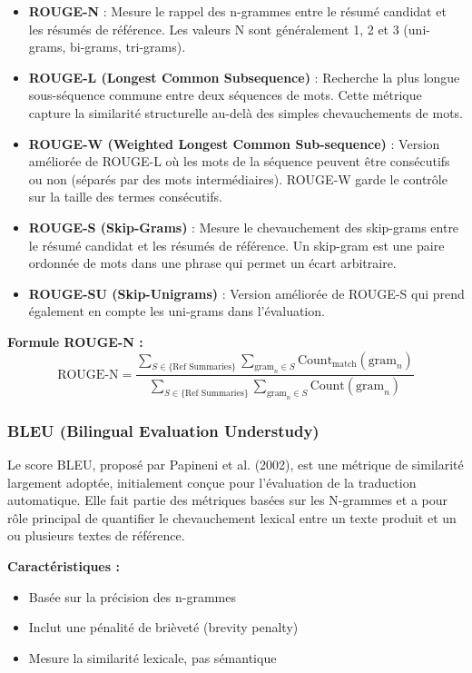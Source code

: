 \begin{itemize}
    \item \textbf{ROUGE-N} : Mesure le rappel des n-grammes entre le résumé candidat et les résumés de référence. Les valeurs N sont généralement 1, 2 et 3 (uni-grams, bi-grams, tri-grams).
    
    \item \textbf{ROUGE-L (Longest Common Subsequence)} : Recherche la plus longue sous-séquence commune entre deux séquences de mots. Cette métrique capture la similarité structurelle au-delà des simples chevauchements de mots.
    
    \item \textbf{ROUGE-W (Weighted Longest Common Sub-sequence)} : Version améliorée de ROUGE-L où les mots de la séquence peuvent être consécutifs ou non (séparés par des mots intermédiaires). ROUGE-W garde le contrôle sur la taille des termes consécutifs.
    
    \item \textbf{ROUGE-S (Skip-Grams)} : Mesure le chevauchement des skip-grams entre le résumé candidat et les résumés de référence. Un skip-gram est une paire ordonnée de mots dans une phrase qui permet un écart arbitraire.
    
    \item \textbf{ROUGE-SU (Skip-Unigrams)} : Version améliorée de ROUGE-S qui prend également en compte les uni-grams dans l'évaluation.
\end{itemize}

\textbf{Formule ROUGE-N :}
\[
\text{ROUGE-N} = \frac{\sum_{S \in \{\text{Ref Summaries}\}} \sum_{\text{gram}_n \in S} \text{Count}_{\text{match}}(\text{gram}_n)}{\sum_{S \in \{\text{Ref Summaries}\}} \sum_{\text{gram}_n \in S} \text{Count}(\text{gram}_n)}
\]

\subsubsection{BLEU (Bilingual Evaluation Understudy)}

Le score BLEU, proposé par Papineni et al. (2002), est une métrique de similarité largement adoptée, initialement conçue pour l'évaluation de la traduction automatique. Elle fait partie des métriques basées sur les N-grammes et a pour rôle principal de quantifier le chevauchement lexical entre un texte produit et un ou plusieurs textes de référence.

\textbf{Caractéristiques :}
\begin{itemize}
    \item Basée sur la précision des n-grammes
    \item Inclut une pénalité de brièveté (brevity penalty)
    \item Mesure la similarité lexicale, pas sémantique
\end{itemize}

